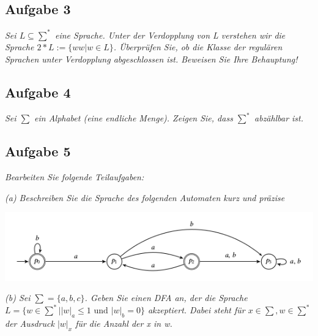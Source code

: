 \documentclass[a4paper]{article}
\begin{document}
\subsection{Aufgabe 3}
\textit{Sei $L\subseteq\sum^*$ eine Sprache. Unter der Verdopplung von L verstehen wir die Sprache $2*L:= \{ww \vert w \in L\}$. Überprüfen Sie, ob die Klasse der regulären Sprachen unter Verdopplung abgeschlossen ist. Beweisen Sie Ihre Behauptung!}

\subsection{Aufgabe 4}
\textit{Sei $\sum$ ein Alphabet (eine endliche Menge). Zeigen Sie, dass $\sum^*$ abzählbar ist.}

\subsection{Aufgabe 5}
\textit{Bearbeiten Sie folgende Teilaufgaben:}

\textit{(a) Beschreiben Sie die Sprache des folgenden Automaten kurz und präzise}
\begin{center}
    \includegraphics[width=1\linewidth]{Assets/ASK_uebung/u02-01.png}
\end{center}
\textit{(b) Sei $\sum = \{a, b, c\}$. Geben Sie einen DFA an, der die Sprache $L = \{w\in\sum^*\vert |w|_a \leq 1 \text{ und } |w|_b = 0\}$ akzeptiert. Dabei steht für $x\in\sum, w\in\sum^*$ der Ausdruck $|w|_x$ für die Anzahl der x in w.}

\end{document}

